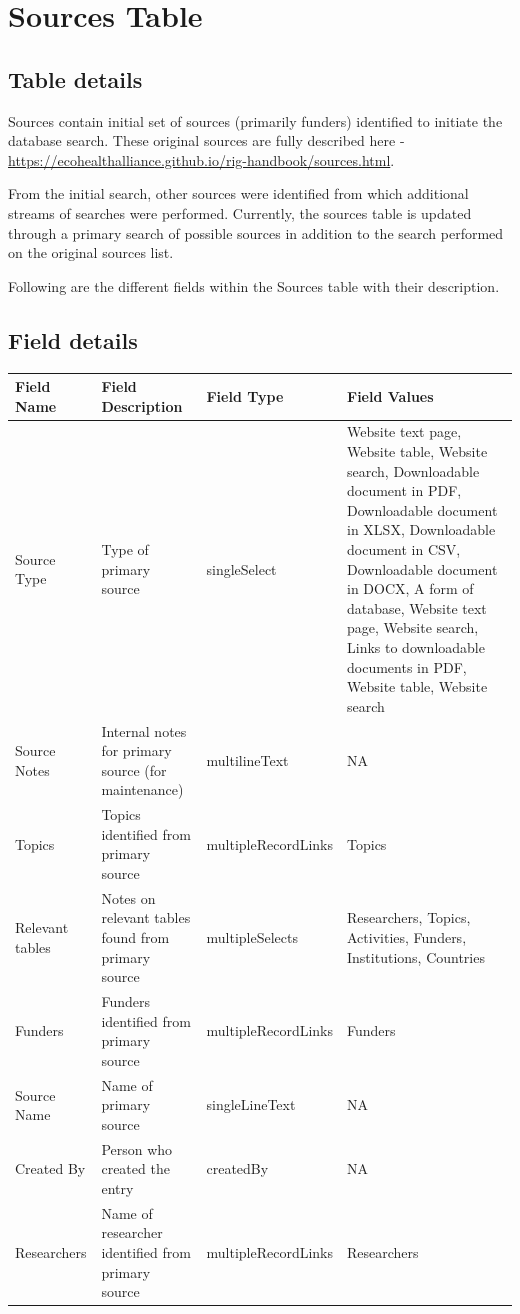 \documentclass[
]{book}
\begin{document}
\hypertarget{sources-table}{%
\section{Sources Table}\label{sources-table}}

\hypertarget{table-details-6}{%
\subsection{Table details}\label{table-details-6}}

Sources contain initial set of sources (primarily funders) identified to initiate the database search. These original sources are fully described here - \url{https://ecohealthalliance.github.io/rig-handbook/sources.html}.

From the initial search, other sources were identified from which additional streams of searches were performed. Currently, the sources table is updated through a primary search of possible sources in addition to the search performed on the original sources list.

Following are the different fields within the Sources table with their description.

\hypertarget{field-details-4}{%
\subsection{Field details}\label{field-details-4}}

\begin{table}
\centering
\begin{tabular}{l|l|l|l}
\hline
\textbf{Field Name} & \textbf{Field Description} & \textbf{Field Type} & \textbf{Field Values}\\
\hline
Source Type & Type of primary source & singleSelect & Website text page, Website table, Website search, Downloadable document in PDF, Downloadable document in XLSX, Downloadable document in CSV, Downloadable document in DOCX, A form of database, Website text page, Website search, Links to downloadable documents in PDF, Website table, Website search\\
\hline
Source Notes & Internal notes for primary source (for maintenance) & multilineText & NA\\
\hline
Topics & Topics identified from primary source & multipleRecordLinks & Topics\\
\hline
Relevant tables & Notes on relevant tables found from primary source & multipleSelects & Researchers, Topics, Activities, Funders, Institutions, Countries\\
\hline
Funders & Funders identified from primary source & multipleRecordLinks & Funders\\
\hline
Source Name & Name of primary source & singleLineText & NA\\
\hline
Created By & Person who created the entry & createdBy & NA\\
\hline
Researchers & Name of researcher identified from primary source & multipleRecordLinks & Researchers\\
\hline
\end{tabular}
\end{table}
\end{document}
